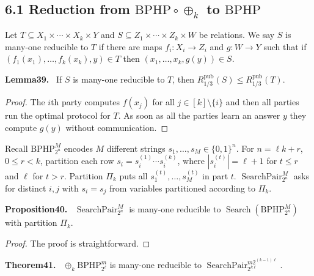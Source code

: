 \documentclass[10pt,a4paper]{article}
\newenvironment{authorclaim}[1]{\par\medskip\noindent\textbf{#1.}\ \ignorespaces}{\par\medskip}
\begin{document}
\subsection*{6.1 Reduction from $\mathrm{BPHP}\circ\oplus_k$ to $\mathrm{BPHP}$}
Let $T\subseteq X_1\times\cdots\times X_k\times Y$ and $S\subseteq Z_1\times\cdots\times Z_k\times W$ be relations. We say $S$ is many-one reducible to $T$ if there are maps $f_i:X_i\to Z_i$ and $g:W\to Y$ such that if $(f_1(x_1),\ldots,f_k(x_k),y)\in T$ then $(x_1,\ldots,x_k,g(y))\in S$.
\begin{authorclaim}{Lemma39}
If $S$ is many-one reducible to $T$, then $R^{\mathrm{pub}}_{1/3}(S)\le R^{\mathrm{pub}}_{1/3}(T)$.
\end{authorclaim}
\begin{proof}
The $i$th party computes $f(x_j)$ for all $j\in[k]\setminus\{i\}$ and then all parties run the optimal protocol for $T$. As soon as all the parties learn an answer $y$ they compute $g(y)$ without communication.
\end{proof}
Recall $\mathrm{BPHP}_{2^n}^M$ encodes $M$ different strings $s_1,\ldots,s_M\in\{0,1\}^n$. For $n=\ell k+r$, $0\le r<k$, partition each row $s_i=s_i^{(1)}\cdots s_i^{(k)}$, where $|s_i^{(t)}|=\ell+1$ for $t\le r$ and $\ell$ for $t>r$. Partition $\Pi_k$ puts all $s_1^{(t)},\ldots,s_M^{(t)}$ in part $t$.
$\operatorname{SearchPair}_{2^n}^M$ asks for distinct $i,j$ with $s_i=s_j$ from variables partitioned according to $\Pi_k$.
\begin{authorclaim}{Proposition40}
$\operatorname{SearchPair}_{2^n}^M$ is many-one reducible to $\operatorname{Search}(\mathrm{BPHP}_{2^n}^M)$ with partition $\Pi_k$.
\end{authorclaim}
\begin{proof}
The proof is straightforward.
\end{proof}
\begin{authorclaim}{Theorem41}
$\oplus_k\mathrm{BPHP}_{2^\ell}^m$ is many-one reducible to $\operatorname{SearchPair}_{2^{k\ell}}^{m2^{(k-1)\ell}}$.
\end{authorclaim}
\end{document}
